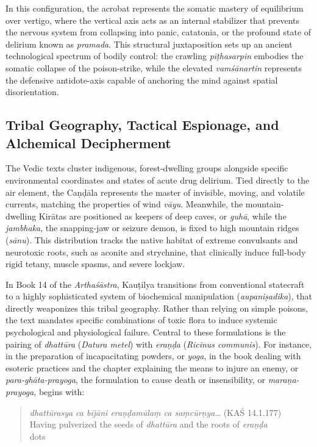 \documentclass[11pt,twoside,letterpaper]{article}
\begin{document}
In this configuration, the acrobat represents the somatic mastery of equilibrium over vertigo, where the vertical axis acts as an internal stabilizer that prevents the nervous system from collapsing into panic, catatonia, or the profound state of delirium known as \textit{pramada}. This structural juxtaposition sets up an ancient technological spectrum of bodily control: the crawling \textit{pīṭhasarpin} embodies the somatic collapse of the poison-strike, while the elevated \textit{vamśānartin} represents the defensive antidote-axis capable of anchoring the mind against spatial disorientation.

\subsection{Tribal Geography, Tactical Espionage, and Alchemical Decipherment}
The Vedic texts cluster indigenous, forest-dwelling groups alongside specific environmental coordinates and states of acute drug delirium. Tied directly to the air element, the Caṇḍāla represents the master of invisible, moving, and volatile currents, matching the properties of wind \textit{vāyu}. Meanwhile, the mountain-dwelling Kirātas are positioned as keepers of deep caves, or \textit{guhā}, while the \textit{jambhaka}, the snapping-jaw or seizure demon, is fixed to high mountain ridges (\textit{sānu}). This distribution tracks the native habitat of extreme convulsants and neurotoxic roots, such as aconite and strychnine, that clinically induce full-body rigid tetany, muscle spasms, and severe lockjaw. 

In Book 14 of the \textit{Arthaśāstra}, Kauṭilya transitions from conventional statecraft to a highly sophisticated system of biochemical manipulation (\textit{aupaniṣadika}), that directly weaponizes this tribal geography. Rather than relying on simple poisons, the text mandates specific combinations of toxic flora to induce systemic psychological and physiological failure. Central to these formulations is the pairing of \textit{dhattūra} (\textit{Datura metel}) with \textit{eraṇḍa} (\textit{Ricinus communis}). For instance, in the preparation of incapacitating powders, or \textit{yoga}, in the book dealing with esoteric practices and the chapter explaining the means to injure an enemy, or \textit{para-ghāta-prayoga}, the formulation to cause death or insensibility, or \textit{maraṇa-prayoga}, begins with:

\begin{quote}
\textit{dhattūrasya ca bījāni eraṇḍamūlaṃ ca saṃcūrṇya\dots}  (KAŚ 14.1.177) \\
Having pulverized the seeds of \textit{dhattūra} and the roots of \textit{eraṇḍa}\\dots\\
\end{quote}
\end{document}
